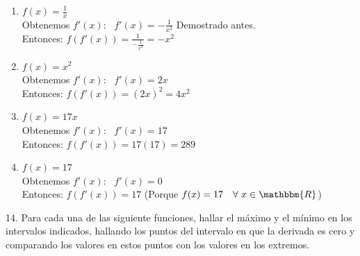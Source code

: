 \documentclass[12pt]{article}
\begin{document}
\begin{enumerate}[\hspace{9px} a)]
    \item \(f(x)=\displaystyle\frac{1}{x}\)\\

        Obtenemos $f'(x)$: \ \(f'(x)=\displaystyle-\frac{1}{x^2}\) \qquad Demostrado antes.\\

        Entonces: \quad \(f(f'(x))=\displaystyle\frac{1}{\displaystyle-\frac{1}{x^2}}=-x^2\)

    \item \(f(x)=x^2\)\\

        Obtenemos $f'(x)$: \ \(f'(x)=2x\)\\

        Entonces: \quad \(f(f'(x))=(2x)^2=4x^2\)

    \item \(f(x)=17x\)\\

        Obtenemos $f'(x)$: \ \(f'(x)=17\)\\

        Entonces: \quad \(f(f'(x))=17(17)=289\)

    \item \(f(x)=17\)\\

        Obtenemos $f'(x)$: \ \(f'(x)=0\)\\

        Entonces: \quad \(f(f'(x))=17\) \qquad (Porque \(f(x)=17 \quad \forall \ x \in \mathbbm{R}\))\\

\end{enumerate}

14. Para cada una de las siguiente funciones, hallar el m\'aximo y el m\'inimo en los intervalos indicados, hallando los puntos del intervalo en que la derivada es cero y comparando los valores en estos puntos con los valores en los extremos.
\end{document}
